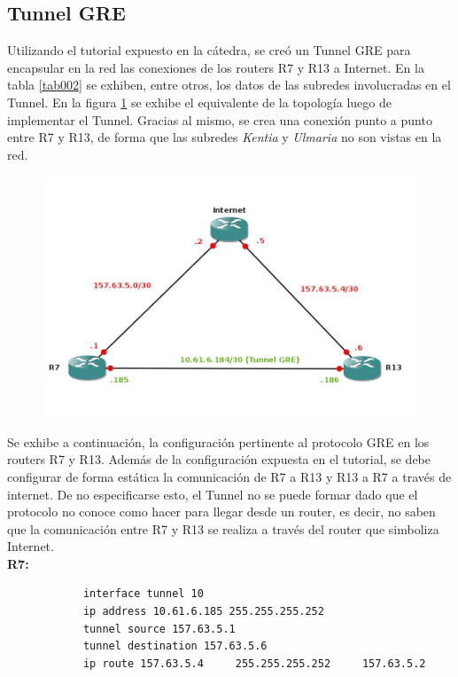	\vspace{0.5cm}	
	\subsection{Tunnel GRE}
		\indent	Utilizando el tutorial expuesto en la cátedra, se creó un Tunnel GRE para encapsular en la red las conexiones de los routers R7 y R13 a Internet. 
		En la tabla \ref{tab002} se exhiben, entre otros, los datos de las subredes involucradas en el Tunnel. En la figura \ref{figGRE001} se exhibe 
		el equivalente de la topología luego de implementar el Tunnel. Gracias al mismo, se crea una conexión punto a punto entre R7 y R13, de forma que las 
		subredes \textit{Kentia} y \textit{Ulmaria} no son vistas en la red.
			\begin{figure}[!htbp]
    	  \centering
     	\includegraphics[width=12cm]{Imagenes/tunnelGRE.jpg}
      	\label{figGRE001}
			\end{figure}

		Se exhibe a continuación, la configuración pertinente al protocolo GRE en los routers R7 y R13. Además de la configuración expuesta en el tutorial, se debe
		configurar de forma estática la comunicación de R7 a R13 y R13 a R7 a través de internet. De no especificarse esto, el Tunnel no se puede formar dado que 
		el protocolo no conoce como hacer para llegar desde un router, es decir, no saben que la comunicación entre R7 y R13 se realiza a través del router que
		simboliza Internet.  \\

		\textbf{R7:}
		\begin{verbatim}
			interface tunnel 10
			ip address 10.61.6.185 255.255.255.252
			tunnel source 157.63.5.1
			tunnel destination 157.63.5.6
			ip route 157.63.5.4 	255.255.255.252 	157.63.5.2
		\end{verbatim}

